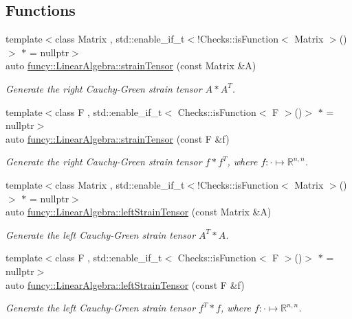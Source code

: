\subsection*{Functions}
\begin{DoxyCompactItemize}
\item 
{\footnotesize template$<$class Matrix , std\-::enable\-\_\-if\-\_\-t$<$!\-Checks\-::is\-Function$<$ Matrix $>$()$>$ $\ast$  = nullptr$>$ }\\auto \hyperlink{namespacefuncy_1_1LinearAlgebra_a4d464ae754aaf51a2be4e59ae32ef1c4}{funcy\-::\-Linear\-Algebra\-::strain\-Tensor} (const Matrix \&A)
\begin{DoxyCompactList}\small\item\em Generate the right Cauchy-\/\-Green strain tensor $A*A^T$. \end{DoxyCompactList}\item 
{\footnotesize template$<$class F , std\-::enable\-\_\-if\-\_\-t$<$ Checks\-::is\-Function$<$ F $>$()$>$ $\ast$  = nullptr$>$ }\\auto \hyperlink{namespacefuncy_1_1LinearAlgebra_af5b125ebe7ad3358d32796a3305bb76b}{funcy\-::\-Linear\-Algebra\-::strain\-Tensor} (const F \&f)
\begin{DoxyCompactList}\small\item\em Generate the right Cauchy-\/\-Green strain tensor $f*f^T$, where $f:\cdot\mapsto\mathbb{R}^{n,n} $. \end{DoxyCompactList}\item 
{\footnotesize template$<$class Matrix , std\-::enable\-\_\-if\-\_\-t$<$!\-Checks\-::is\-Function$<$ Matrix $>$()$>$ $\ast$  = nullptr$>$ }\\auto \hyperlink{namespacefuncy_1_1LinearAlgebra_aab1b8d60b9d90f8225a743686a9229b8}{funcy\-::\-Linear\-Algebra\-::left\-Strain\-Tensor} (const Matrix \&A)
\begin{DoxyCompactList}\small\item\em Generate the left Cauchy-\/\-Green strain tensor $A^T*A$. \end{DoxyCompactList}\item 
{\footnotesize template$<$class F , std\-::enable\-\_\-if\-\_\-t$<$ Checks\-::is\-Function$<$ F $>$()$>$ $\ast$  = nullptr$>$ }\\auto \hyperlink{namespacefuncy_1_1LinearAlgebra_a68eb9f89b75132e9ab77829e188cf8a7}{funcy\-::\-Linear\-Algebra\-::left\-Strain\-Tensor} (const F \&f)
\begin{DoxyCompactList}\small\item\em Generate the left Cauchy-\/\-Green strain tensor $f^T*f$, where $f:\cdot\mapsto\mathbb{R}^{n,n} $. \end{DoxyCompactList}\end{DoxyCompactItemize}
